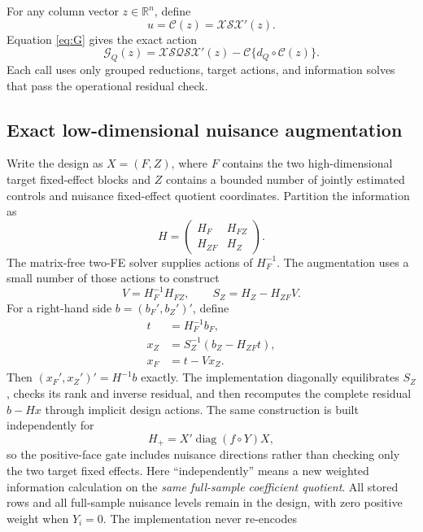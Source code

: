 \documentclass[11pt]{article}
\newcommand{\diag}{\operatorname{diag}}
\newcommand{\R}{\mathbb R}
\begin{document}
For any column vector $z\in\R^n$, define
\[
 u=\mathcal C(z)=\mathcal X\mathcal S\mathcal X'(z).
\]
Equation \eqref{eq:G} gives the exact action
\begin{equation}
 \mathcal G_Q(z)
 =\mathcal X\mathcal S\mathcal Q\mathcal S\mathcal X'(z)
  -\mathcal C\{d_Q\circ\mathcal C(z)\}.               \label{eq:Gaction}
\end{equation}
Each call uses only grouped reductions, target actions, and information solves
that pass the operational residual check.

\subsection{Exact low-dimensional nuisance augmentation}

Write the design as $X=(F,Z)$, where $F$ contains the two high-dimensional
target fixed-effect blocks and $Z$ contains a bounded number of jointly
estimated controls and nuisance fixed-effect quotient coordinates. Partition
the information as
\[
 H=\begin{pmatrix}H_F&H_{FZ}\\H_{ZF}&H_Z\end{pmatrix}.
\]
The matrix-free two-FE solver supplies actions of $H_F^{-1}$. The augmentation
uses a small number of those actions to construct
\begin{equation}
 V=H_F^{-1}H_{FZ},\qquad
 S_Z=H_Z-H_{ZF}V.                                      \label{eq:nuisance-schur}
\end{equation}
For a right-hand side $b=(b_F',b_Z')'$, define
\begin{align}
 t&=H_F^{-1}b_F,\\
 x_Z&=S_Z^{-1}(b_Z-H_{ZF}t),\\
 x_F&=t-Vx_Z.                                          \label{eq:nuisance-action}
\end{align}
Then $(x_F',x_Z')'=H^{-1}b$ exactly. The implementation diagonally
equilibrates $S_Z$, checks its rank and inverse residual, and then recomputes
the complete residual $b-Hx$ through implicit design actions. The same
construction is built independently for
\[
 H_+=X'\diag(f\circ Y)X,
\]
so the positive-face gate includes nuisance directions rather than checking
only the two target fixed effects. Here ``independently'' means a new weighted
information calculation on the \emph{same full-sample coefficient quotient}.
All stored rows and all full-sample nuisance levels remain in the design, with
zero positive weight when $Y_i=0$. The implementation never re-encodes
\end{document}

